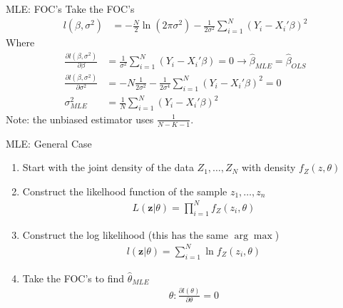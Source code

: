 \documentclass[aspectratio=169]{beamer}
\begin{document}
\begin{frame}{MLE: FOC's}
Take the FOC's
\begin{align*}
l(\beta,\sigma^2) &= -\frac{N}{2} \ln (2 \pi \sigma^2) - \frac{1}{2 \sigma^2} \sum_{i=1}^N(Y_i - X_i' \beta)^2
\end{align*}
Where 
\begin{align*} 
\frac{ \partial l(\beta,\sigma^2) }{\partial \beta}&= \frac{1}{ \sigma^2}\sum_{i=1}^N(Y_i - X_i' \beta) = 0 \rightarrow \widehat{\beta}_{MLE}= \widehat{\beta}_{OLS}\\ 
\frac{ \partial l(\beta,\sigma^2) }{\partial \sigma^2}&= -N \frac{1}{2 \sigma^2}  -  \frac{1}{2 \sigma^4} \sum_{i=1}^N(Y_i - X_i' \beta)^2 = 0 \\
\sigma^2_{MLE} &= \frac{1}{N} \sum_{i=1}^N (Y_i - X_i' \beta)^2
\end{align*}
Note: the unbiased estimator uses $\frac{1}{N-K-1}$.
\end{frame}

\begin{frame}{MLE: General Case}
\begin{enumerate}
\item Start with the \alert{joint density of the data} $Z_1,\ldots,Z_N$ with density $f_Z(z,\theta)$
\item Construct the likelhood function of the sample $z_1,\ldots,z_n$
\begin{align*}
L(\mathbf{z} | \theta) = \prod_{i=1}^N f_Z(z_i,\theta)
\end{align*}
\item Construct the \alert{log likelihood} (this has the same $\arg \max$)
\begin{align*}
l(\mathbf{z} | \theta) = \sum_{i=1}^N \ln f_Z(z_i,\theta)
\end{align*}
\item Take the FOC's to find $\widehat{\theta}_{MLE}$
\begin{align*}
\theta : \frac{\partial l(\theta)}{\partial \theta} =0
\end{align*}
\end{enumerate}
\end{frame}
\end{document}
